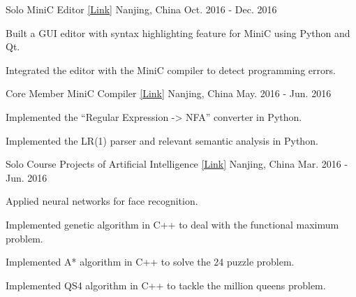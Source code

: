 

\begin{cventries}

  \cventry
    {Solo} %
    {MiniC Editor \href{https://github.com/yanshengjia/nucleon}{[\underline{Link}]}} %
    {Nanjing, China} %
    {Oct. 2016 - Dec. 2016} %
    {
      \begin{cvitems} %
        \item {Built a GUI editor with syntax highlighting feature for MiniC using Python and Qt.}
        \item {Integrated the editor with the MiniC compiler to detect programming errors.}
      \end{cvitems}
    }

  \cventry
    {Core Member} %
    {MiniC Compiler \href{https://github.com/yanshengjia/compiler}{[\underline{Link}]}} %
    {Nanjing, China} %
    {May. 2016 - Jun. 2016} %
    {
      \begin{cvitems} %
        \item {Implemented the ``Regular Expression -> NFA'' converter in Python.}
        \item {Implemented the LR(1) parser and relevant semantic analysis in Python.}
      \end{cvitems}
    }

  \cventry
    {Solo} %
    {Course Projects of Artificial Intelligence \href{https://github.com/yanshengjia/artificial-intelligence}{[\underline{Link}]}} %
    {Nanjing, China} %
    {Mar. 2016 - Jun. 2016} %
    {
      \begin{cvitems} %
        \item {Applied neural networks for face recognition.}
        \item {Implemented genetic algorithm in C++ to deal with the functional maximum problem.}
        \item {Implemented A* algorithm in C++ to solve the 24 puzzle problem.}
        \item {Implemented QS4 algorithm in C++ to tackle the million queens problem.}
      \end{cvitems}
    }


\end{cventries}
